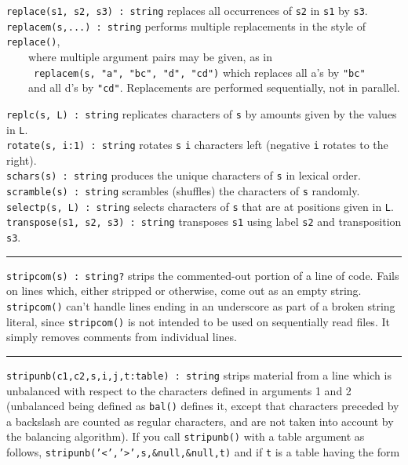 \texttt{replace(s1, s2, s3) : string} replaces all occurrences of
\texttt{s2} in \texttt{s1} by \texttt{s3}.\\
\texttt{replacem(s,...) : string} performs multiple replacements in the style of \texttt{replace()},\\
 \ \ \ \ where multiple
argument pairs may be given, as in\\
 \ \ \ \ \ \texttt{replacem(s, "a",
"bc", "d",
"cd")} which replaces all
a's by
\texttt{"bc"}\\
\ \ \ \ and all d's by
\texttt{"cd"}. Replacements are performed
sequentially, not in parallel.

\texttt{replc(s, L) : string} replicates characters of \texttt{s} by
amounts given by the values in \texttt{L}.\\
\texttt{rotate(s, i:1) : string} rotates \texttt{s} \texttt{i}
characters left (negative \texttt{i} rotates to the
right).\\
\texttt{schars(s) : string} produces the unique characters of \texttt{s}
in lexical order.\\
\texttt{scramble(s) : string} scrambles (shuffles) the characters of
\texttt{s} randomly.\\
\texttt{selectp(s, L) : string} selects characters of \texttt{s} that
are at positions given in \texttt{L}.\\
\texttt{transpose(s1, s2, s3) : string} transposes \texttt{s1} using
label \texttt{s2} and transposition \texttt{s3}.

\vspace{0.25cm}\hrule{}

\texttt{stripcom(s) : string?} strips the commented-out portion of a
line of code. Fails on lines which, either stripped or otherwise,
come out as an empty string. \texttt{stripcom()} can't
handle lines ending in an underscore as part of a broken string
literal, since \texttt{stripcom()} is not intended to be used on
sequentially read files. It simply removes comments from
individual lines.

\vspace{0.25cm}\hrule{}

\texttt{stripunb(c1,c2,s,i,j,t:table) : string} strips material from a
line which is unbalanced with respect to the characters defined in
arguments 1 and 2 (unbalanced being defined as \texttt{bal()} defines
it, except that characters preceded by a backslash are counted as
regular characters, and are not taken into account by the balancing
algorithm). If you call \texttt{stripunb()} with a table argument as
follows,
\texttt{stripunb('{\textless}','{\textgreater}',s,\&null,\&null,t)}
and if \texttt{t} is a table having the form

